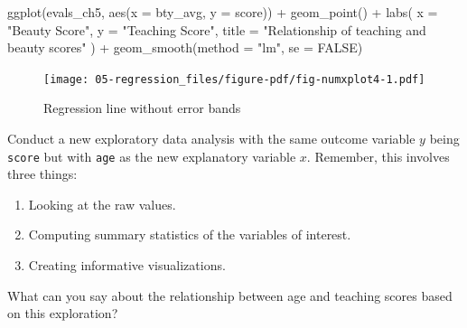 \documentclass[
  letterpaper,
  DIV=11,
  numbers=noendperiod]{scrreprt}
\newenvironment{Shaded}{\begin{snugshade}}{\end{snugshade}}
\newcommand{\AttributeTok}[1]{\textcolor[rgb]{0.40,0.45,0.13}{#1}}
\newcommand{\ConstantTok}[1]{\textcolor[rgb]{0.56,0.35,0.01}{#1}}
\newcommand{\FunctionTok}[1]{\textcolor[rgb]{0.28,0.35,0.67}{#1}}
\newcommand{\NormalTok}[1]{\textcolor[rgb]{0.00,0.23,0.31}{#1}}
\newcommand{\SpecialCharTok}[1]{\textcolor[rgb]{0.37,0.37,0.37}{#1}}
\newcommand{\StringTok}[1]{\textcolor[rgb]{0.13,0.47,0.30}{#1}}
\providecommand{\tightlist}{%
  \setlength{\itemsep}{0pt}\setlength{\parskip}{0pt}}\usepackage{longtable,booktabs,array}
\theoremstyle{definition}
\theoremstyle{remark}
\begin{document}
\begin{Shaded}
\begin{Highlighting}[]
\FunctionTok{ggplot}\NormalTok{(evals\_ch5, }\FunctionTok{aes}\NormalTok{(}\AttributeTok{x =}\NormalTok{ bty\_avg, }\AttributeTok{y =}\NormalTok{ score)) }\SpecialCharTok{+}
  \FunctionTok{geom\_point}\NormalTok{() }\SpecialCharTok{+}
  \FunctionTok{labs}\NormalTok{(}
    \AttributeTok{x =} \StringTok{"Beauty Score"}\NormalTok{, }
    \AttributeTok{y =} \StringTok{"Teaching Score"}\NormalTok{, }
    \AttributeTok{title =} \StringTok{"Relationship of teaching and beauty scores"}
\NormalTok{    ) }\SpecialCharTok{+}
  \FunctionTok{geom\_smooth}\NormalTok{(}\AttributeTok{method =} \StringTok{"lm"}\NormalTok{, }\AttributeTok{se =} \ConstantTok{FALSE}\NormalTok{)}
\end{Highlighting}
\end{Shaded}

\begin{figure}[H]

{\centering \texttt{[image: 05-regression\_files/figure-pdf/fig-numxplot4-1.pdf]}

}

\caption{\label{fig-numxplot4}Regression line without error bands}

\end{figure}

\begin{tcolorbox}[enhanced jigsaw, colback=white, toprule=.15mm, bottomrule=.15mm, titlerule=0mm, title={{🎯} Learning Check 5.1}, leftrule=.75mm, arc=.35mm, left=2mm, colframe=quarto-callout-tip-color-frame, coltitle=black, opacitybacktitle=0.6, bottomtitle=1mm, colbacktitle=quarto-callout-tip-color!10!white, opacityback=0, toptitle=1mm, rightrule=.15mm, breakable]

Conduct a new exploratory data analysis with the same outcome variable
\(y\) being \texttt{score} but with \texttt{age} as the new explanatory
variable \(x\). Remember, this involves three things:

\begin{enumerate}
\def\labelenumi{\alph{enumi})}
\tightlist
\item
  Looking at the raw values.
\item
  Computing summary statistics of the variables of interest.
\item
  Creating informative visualizations.
\end{enumerate}

What can you say about the relationship between age and teaching scores
based on this exploration?

\end{tcolorbox}
\end{document}
